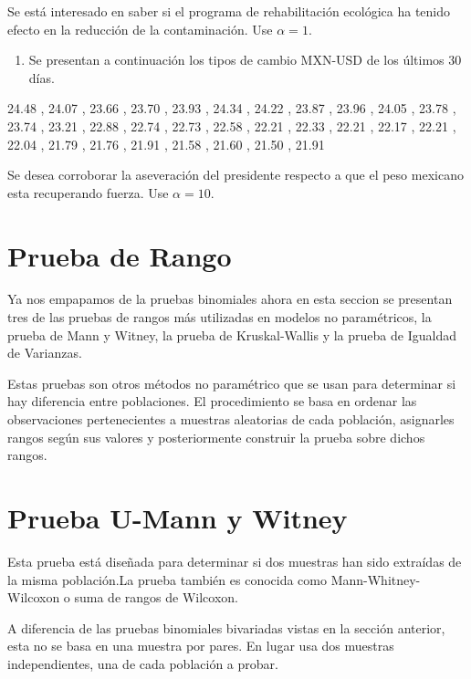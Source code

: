 \documentclass[
  a4paper,
  oneside,
  openany]{book}
\providecommand{\tightlist}{%
  \setlength{\itemsep}{0pt}\setlength{\parskip}{0pt}}
\begin{document}
Se está interesado en saber si el programa de rehabilitación ecológica ha tenido efecto en la reducción de la contaminación. Use \(\alpha =1%
\).

\begin{enumerate}
\def\labelenumi{\arabic{enumi}.}
\setcounter{enumi}{1}
\tightlist
\item
  Se presentan a continuación los tipos de cambio MXN-USD de los últimos 30 días.
\end{enumerate}

24.48 ,
24.07 ,
23.66 ,
23.70 ,
23.93 ,
24.34 ,
24.22 ,
23.87 ,
23.96 ,
24.05 ,
23.78 ,
23.74 ,
23.21 ,
22.88 ,
22.74 ,
22.73 ,
22.58 ,
22.21 ,
22.33 ,
22.21 ,
22.17 ,
22.21 ,
22.04 ,
21.79 ,
21.76 ,
21.91 ,
21.58 ,
21.60 ,
21.50 ,
21.91

Se desea corroborar la aseveración del presidente respecto a que el peso mexicano esta recuperando fuerza. Use \(\alpha =10%
\).

\hypertarget{prueba-de-rango}{%
\chapter*{Prueba de Rango}\label{prueba-de-rango}}


Ya nos empapamos de la pruebas binomiales ahora en esta seccion se presentan tres de las pruebas de rangos más utilizadas en modelos no paramétricos, la prueba de Mann y Witney, la prueba de Kruskal-Wallis y la prueba de Igualdad de Varianzas.

Estas pruebas son otros métodos no paramétrico que se usan para determinar si hay diferencia entre poblaciones. El procedimiento se basa en ordenar las observaciones pertenecientes a muestras aleatorias de cada población, asignarles rangos según sus valores y posteriormente construir la prueba sobre dichos rangos.

\hypertarget{prueba-u-mann-y-witney}{%
\chapter{Prueba U-Mann y Witney}\label{prueba-u-mann-y-witney}}

Esta prueba está diseñada para determinar si dos muestras han sido extraídas de la misma población.La prueba también es conocida como Mann-Whitney-Wilcoxon o suma de rangos de Wilcoxon.

A diferencia de las pruebas binomiales bivariadas vistas en la sección anterior, esta no se basa en una muestra por pares. En lugar usa dos muestras independientes, una de cada población a probar.
\end{document}
